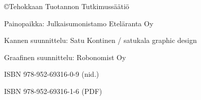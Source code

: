 \clearpage\null\vfill
\pagestyle{empty}
\begin{minipage}[b]{0.9\textwidth}
\footnotesize\raggedright
\setlength{\parskip}{0.5\baselineskip}

\copyright Tehokkaan Tuotannon Tutkimussäätiö \the\year\par
Painopaikka: Julkaisumonistamo Eteläranta Oy\par
Kannen suunnittelu: Satu Kontinen / satukala graphic design\par
Graafinen suunnittelu: Robonomist Oy\par
ISBN 978-952-69316-0-9 (nid.)\par
ISBN 978-952-69316-1-6 (PDF)\par

\end{minipage}
\vspace*{2\baselineskip}
\cleardoublepage
\pagestyle{plain}


